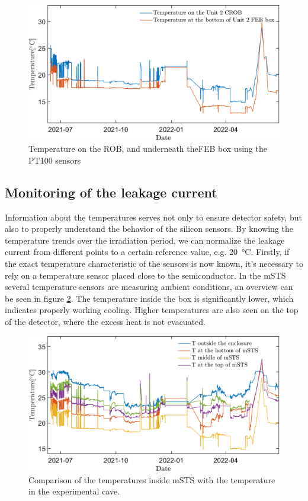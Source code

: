\begin{figure}[!h]
\centering
\includegraphics[width=0.9\columnwidth]{Chapter6/DCS/images/ROBvsFEB.png}
\caption{Temperature on the \gls{ROB}, and underneath the\gls{FEB} box using the PT100 sensors}
\label{fig_robvsfeb}
\end{figure}

\newpage

\subsection{Monitoring of the leakage current}

Information about the temperatures serves not only to ensure detector safety, but also to properly understand the behavior of the silicon sensors. By knowing the temperature trends over the irradiation period, we can normalize the leakage current from different points to a certain reference value, e.g. \SI{20}{\celsius}. Firstly, if the exact temperature characteristic of the sensors is now known, it's necessary to rely on a temperature sensor placed close to the semiconductor. In the \gls{mSTS} several temperature  sensors are measuring ambient conditions, an overview can be seen in figure \ref{fig_temperatures}. The temperature inside the box is significantly lower, which indicates properly working cooling. Higher temperatures are also seen on the top of the detector, where the excess heat is not evacuated. 

\begin{figure}[!h]
\centering
\includegraphics[width=0.9\columnwidth]{Chapter6/DCS/images/rates/tempmSTS.png}
\caption{Comparison of the temperatures inside \gls{mSTS} with the temperature in the experimental cave.}
\label{fig_temperatures}
\end{figure}

